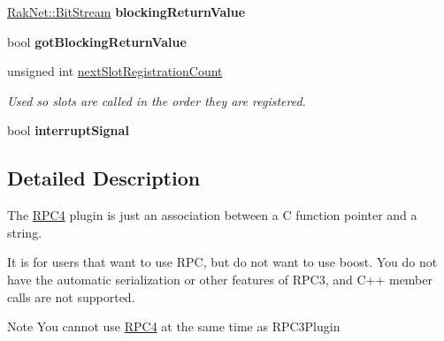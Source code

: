 \begin{DoxyCompactItemize}
\item 
\hypertarget{class_rak_net_1_1_r_p_c4_ac581870dfefc9a3d7d98292a4752d3f4}{\hyperlink{class_rak_net_1_1_bit_stream}{Rak\-Net\-::\-Bit\-Stream} {\bfseries blocking\-Return\-Value}}\label{class_rak_net_1_1_r_p_c4_ac581870dfefc9a3d7d98292a4752d3f4}

\item 
\hypertarget{class_rak_net_1_1_r_p_c4_a77ceb7801941e08f9d867c91b1ff52bf}{bool {\bfseries got\-Blocking\-Return\-Value}}\label{class_rak_net_1_1_r_p_c4_a77ceb7801941e08f9d867c91b1ff52bf}

\item 
\hypertarget{class_rak_net_1_1_r_p_c4_af8b977746f6e1f0d11f6119a847fd9c5}{unsigned int \hyperlink{class_rak_net_1_1_r_p_c4_af8b977746f6e1f0d11f6119a847fd9c5}{next\-Slot\-Registration\-Count}}\label{class_rak_net_1_1_r_p_c4_af8b977746f6e1f0d11f6119a847fd9c5}

\begin{DoxyCompactList}\small\item\em Used so slots are called in the order they are registered. \end{DoxyCompactList}\item 
\hypertarget{class_rak_net_1_1_r_p_c4_a14aa902561ed101e8aabd5b135da7962}{bool {\bfseries interrupt\-Signal}}\label{class_rak_net_1_1_r_p_c4_a14aa902561ed101e8aabd5b135da7962}

\end{DoxyCompactItemize}


\subsection{Detailed Description}
The \hyperlink{class_rak_net_1_1_r_p_c4}{R\-P\-C4} plugin is just an association between a C function pointer and a string. 

It is for users that want to use R\-P\-C, but do not want to use boost. You do not have the automatic serialization or other features of R\-P\-C3, and C++ member calls are not supported. \begin{DoxyNote}{Note}
You cannot use \hyperlink{class_rak_net_1_1_r_p_c4}{R\-P\-C4} at the same time as R\-P\-C3\-Plugin 
\end{DoxyNote}


